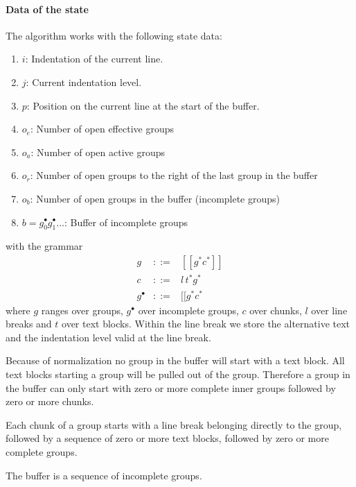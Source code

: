 \documentclass[12pt]{article}
\begin{document}
\paragraph{Data of the state} The algorithm works with the following state
data:
\begin{enumerate}
\item $i$: Indentation of the current line.

\item $j$: Current indentation level.

\item $p$: Position on the current line at the start of the buffer.

\item $o_e$: Number of open effective groups

\item $o_a$: Number of open active groups

\item $o_r$: Number of open groups to the right of the last group in the
  buffer

\item $o_b$: Number of open groups in the buffer (incomplete groups)

\item $b = g^\bullet_0 g^\bullet_1 \ldots$: Buffer of incomplete groups
\end{enumerate}
%
with the grammar
$$
\begin{array}{lll}
  g & ::= & [\![ g^* c^* ]\!]
  \\
  c & ::= & l\, t^* g^*
  \\
  g^\bullet & ::= & [\![ g^* c^*
\end{array}
$$
where $g$ ranges over groups, $g^\bullet$ over incomplete groups,
$c$ over chunks, $l$ over line breaks and
$t$ over text blocks. Within the line break we store the alternative text and
the indentation level valid at the line break.

Because of normalization no group in the buffer will start with a text
block. All text blocks starting a group will be pulled out of the
group. Therefore a group in the buffer can only start with zero or more
complete inner groups followed by zero or more chunks.

Each chunk of a group starts with a line break belonging directly to the
group, followed by a sequence of zero or more text blocks, followed by zero or
more complete groups.

The buffer is a sequence of incomplete groups.
\end{document}
